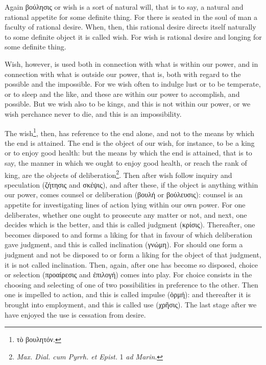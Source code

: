 Again \textgreek{βούλησις} or wish is a sort of natural will, that is to say, a natural and rational appetite for some definite thing. For there is seated in the soul of man a faculty of rational desire. When, then, this rational desire directs itself naturally to some definite object it is called wish. For wish is rational desire and longing for some definite thing.

Wish, however, is used both in connection with what is within our power, and in connection with what is outside our power, that is, both with regard to the possible and the impossible. For we wish often to indulge lust or to be temperate, or to sleep and the like, and these are within our power to accomplish, and possible. But we wish also to be kings, and this is not within our power, or we wish perchance never to die, and this is an impossibility.

The wish\footnote{\textgreek{τὸ βουλητόν}.}, then, has reference to the end alone, and not to the means by which the end is attained. The end is the object of our wish, for instance, to be a king or to enjoy good health: but the means by which the end is attained, that is to say, the manner in which we ought to enjoy good health, or reach the rank of king, are the objects of deliberation\footnote{\emph{Max. Dial. cum Pyrrh. et Epist. }1 \emph{ad Marin}.}. Then after wish follow inquiry and speculation (\textgreek{ζήτησις} and \textgreek{σκέψις}), and after these, if the object is anything within our power, comes counsel or deliberation (\textgreek{βουλή} or \textgreek{βούλευσις}): counsel is an appetite for investigating lines of action lying within our own power. For one deliberates, whether one ought to prosecute any matter or not, and next, one decides which is the better, and this is called judgment (\textgreek{κρίσις}). Thereafter, one becomes disposed to and forms a liking for that in favour of which deliberation gave judgment, and this is called inclination (\textgreek{γνώμη}). For should one form a judgment and not be disposed to or form a liking for the object of that judgment, it is not called inclination. Then, again, after one has become so disposed, choice or selection (\textgreek{προαίρεσις} and \textgreek{ἐπιλογή}) comes into play. For choice consists in the choosing and selecting of one of two possibilities in preference to the other. Then one is impelled to action, and this is called impulse (\textgreek{ὁρμή}): and thereafter it is brought into employment, and this is called use (\textgreek{χρῆσις}). The last stage after we have enjoyed the use is cessation from desire.

